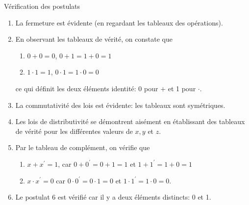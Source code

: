\documentclass[presentation]{beamer}
\begin{document}
\begin{frame}[label={sec:orgeadb8d6}]{Vérification des postulats}
\begin{enumerate}
\item La fermeture est évidente (en regardant les tableaux des opérations).

\item En observant les tableaux de vérité, on constate que

\begin{enumerate}
\item \(0 + 0 = 0\), \(0 + 1 = 1 + 0 = 1\)

\item \(1 \cdot 1 = 1\), \(0 \cdot 1 = 1 \cdot 0 = 0\)
\end{enumerate}

ce qui définit les deux éléments identité: 0 pour \(+\) et 1 pour  \(\cdot\).

\item La commutativité des lois est évidente: les tableaux sont
symétriques.

\item Les lois de distributivité se démontrent aisément en établissant des
tableaux de vérité pour les différentes valeurs de \(x, y\) et \(z\).

\item Par le tableau de complément, on vérifie que

\begin{enumerate}
\item \(x + x^{\prime} = 1\), car \(0 + 0^{\prime} = 0 + 1 = 1\) et \(1 +
        1^{\prime} = 1+ 0 = 1\)

\item \(x \cdot x^{\prime} = 0\) car \(0 \cdot 0^{\prime} = 0 \cdot 1 =
        0\) et \(1 \cdot 1^{\prime} = 1 \cdot 0 = 0\).
\end{enumerate}

\item Le postulat 6 est vérifié car il y a deux éléments distincts: 0 et 1.
\end{enumerate}
\end{frame}
\end{document}
